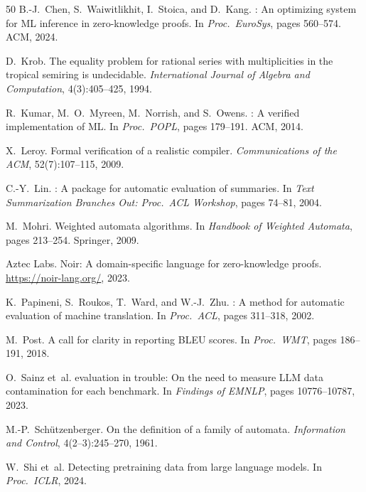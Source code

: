 \documentclass[11pt]{article}
\begin{document}
\begin{thebibliography}{50}
B.-J.~Chen, S.~Waiwitlikhit, I.~Stoica, and D.~Kang.
: An optimizing system for {ML} inference in zero-knowledge
  proofs.
\newblock In \emph{Proc.\ EuroSys}, pages 560--574. ACM, 2024.

D.~Krob.
\newblock The equality problem for rational series with multiplicities in the
  tropical semiring is undecidable.
\newblock \emph{International Journal of Algebra and Computation},
  4(3):405--425, 1994.

R.~Kumar, M.~O.~Myreen, M.~Norrish, and S.~Owens.
: A verified implementation of {ML}.
\newblock In \emph{Proc.\ POPL}, pages 179--191. ACM, 2014.

X.~Leroy.
\newblock Formal verification of a realistic compiler.
\newblock \emph{Communications of the ACM}, 52(7):107--115, 2009.

C.-Y.~Lin.
: A package for automatic evaluation of summaries.
\newblock In \emph{Text Summarization Branches Out: Proc.\ ACL Workshop},
  pages 74--81, 2004.

M.~Mohri.
\newblock Weighted automata algorithms.
\newblock In \emph{Handbook of Weighted Automata}, pages 213--254. Springer,
  2009.

Aztec Labs.
\newblock Noir: A domain-specific language for zero-knowledge proofs.
\newblock \url{https://noir-lang.org/}, 2023.

K.~Papineni, S.~Roukos, T.~Ward, and W.-J.~Zhu.
: A method for automatic evaluation of machine translation.
\newblock In \emph{Proc.\ ACL}, pages 311--318, 2002.

M.~Post.
\newblock A call for clarity in reporting {BLEU} scores.
\newblock In \emph{Proc.\ WMT}, pages 186--191, 2018.

O.~Sainz et~al.
 evaluation in trouble: On the need to measure {LLM} data
  contamination for each benchmark.
\newblock In \emph{Findings of EMNLP}, pages 10776--10787, 2023.

M.-P.~Sch\"utzenberger.
\newblock On the definition of a family of automata.
\newblock \emph{Information and Control}, 4(2--3):245--270, 1961.

W.~Shi et~al.
\newblock Detecting pretraining data from large language models.
\newblock In \emph{Proc.\ ICLR}, 2024.


\end{thebibliography}
\end{document}
